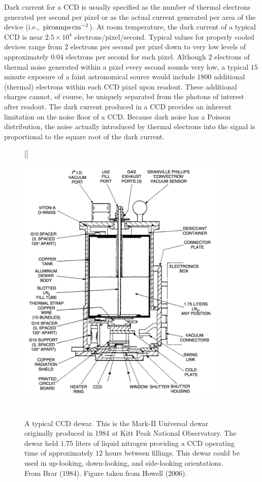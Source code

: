 \documentclass[a4paper,10pt]{article}
\begin{document}
{\noindent}Dark current for a CCD is usually specified as the number of thermal electrons generated per second per pixel or as the actual current generated per area of the device (i.e., ${\rm picoamps\,cm^{-2}}$). At room temperature, the dark current of a typical CCD is near $2.5\times10^4$ electrons/pixel/second. Typical values for properly cooled devices range from $2$ electrons per second per pixel down to very low levels of approximately $0.04$ electrons per second for each pixel. Although $2$ electrons of thermal noise generated within a pixel every second sounds very low, a typical $15$ minute exposure of a faint astronomical source would include $1800$ additional (thermal) electrons within each CCD pixel upon readout. These additional charges cannot, of course, be uniquely separated from the photons of interest after readout. The dark current produced in a CCD provides an inherent limitation on the noise floor of a CCD. Because dark noise has a Poisson distribution, the noise actually introduced by thermal electrons into the signal is proportional to the square root of the dark current.

\begin{figure}[t]
    [\FBwidth]
    {\caption{\footnotesize{\\A typical CCD dewar. This is the Mark-II Universal dewar originally produced in 1984 at Kitt Peak National Observatory. The dewar held $1.75$ liters of liquid nitrogen providing a CCD operating time of approximately $12$ hours between fillings. This dewar could be used in up-looking, down-looking, and side-looking orientations. From Brar (1984). Figure taken from Howell (2006).}}
    \label{fig:dewar}}
    {\includegraphics[width=10cm]{figures/dewar.png}}
\end{figure}
\end{document}
